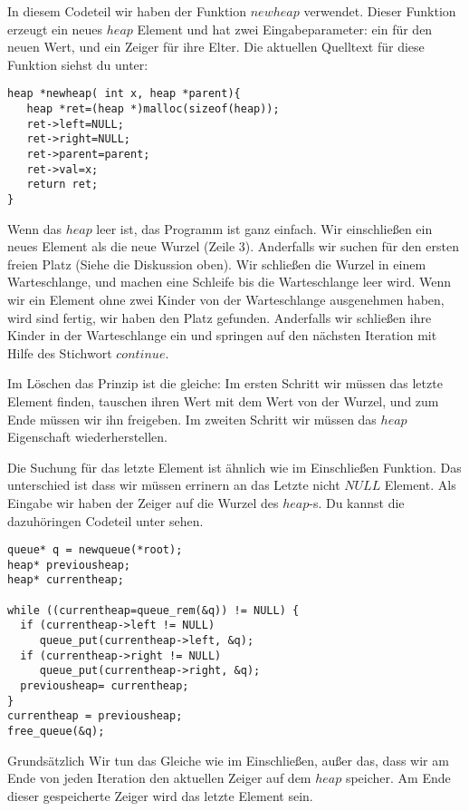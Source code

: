 In diesem Codeteil wir haben der Funktion $newheap$ verwendet. Dieser Funktion
erzeugt ein neues $heap$ Element und hat zwei Eingabeparameter: ein für den neuen 
Wert, und ein Zeiger für ihre Elter. Die aktuellen Quelltext für diese Funktion 
siehst du unter:
\begin{lstlisting}
heap *newheap( int x, heap *parent){
   heap *ret=(heap *)malloc(sizeof(heap));
   ret->left=NULL;
   ret->right=NULL;
   ret->parent=parent;
   ret->val=x;
   return ret;
}
\end{lstlisting}
Wenn das $heap$ leer ist, das Programm ist ganz einfach. Wir einschließen ein neues 
Element als die neue Wurzel (Zeile 3). Anderfalls wir suchen für den ersten freien Platz
(Siehe die Diskussion oben). Wir schließen die Wurzel in einem Warteschlange, und 
machen eine Schleife bis die Warteschlange leer wird. Wenn wir ein Element
ohne zwei Kinder von der Warteschlange ausgenehmen haben, wird sind fertig, wir
haben den Platz gefunden. Anderfalls wir schließen ihre Kinder in der Warteschlange
ein und springen auf den nächsten Iteration mit Hilfe des Stichwort $continue$.

Im Löschen das Prinzip ist die gleiche: Im ersten Schritt wir müssen das letzte Element 
finden, tauschen ihren Wert mit dem Wert von der Wurzel, und zum Ende müssen wir ihn
freigeben. Im zweiten Schritt wir müssen das $heap$ Eigenschaft wiederherstellen.

Die Suchung für das letzte Element ist ähnlich wie im Einschließen Funktion. Das
unterschied ist dass wir müssen errinern an das Letzte nicht $NULL$ Element. Als 
Eingabe wir haben der Zeiger auf die Wurzel des $heap$-s. Du kannst die dazuhöringen
Codeteil unter sehen.
\begin{lstlisting}
queue* q = newqueue(*root);
heap* previousheap;
heap* currentheap;

while ((currentheap=queue_rem(&q)) != NULL) {
  if (currentheap->left != NULL)
     queue_put(currentheap->left, &q);
  if (currentheap->right != NULL)
     queue_put(currentheap->right, &q);
  previousheap= currentheap;
}
currentheap = previousheap;
free_queue(&q);
\end{lstlisting}
Grundsätzlich Wir tun das Gleiche wie im Einschließen, außer das, dass wir am Ende 
von jeden Iteration den aktuellen Zeiger auf dem $heap$ speicher. Am Ende 
dieser gespeicherte Zeiger wird das letzte Element sein. 

